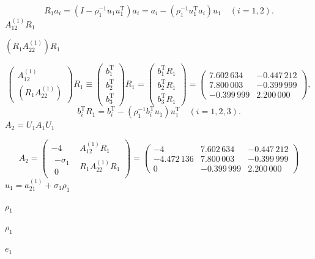 \documentclass[UTF8,fontset=fandol]{ctexart}
\begin{document}
\[
R_1a_i=(I-\rho_1^{-1}u_1u_1^{\mathrm T})a_i
=a_i-(\rho_1^{-1}u_1^{\mathrm T}a_i)u_1\quad(i=1,2).
\]
$A_{12}^{(1)}R_1$\par
$(R_1A_{22}^{(1)})R_1$\par
\[
\begin{pmatrix}A_{12}^{(1)}\\(R_1A_{22}^{(1)})\end{pmatrix}R_1
\equiv\begin{pmatrix}b_1^{\mathrm T}\\b_2^{\mathrm T}\\b_3^{\mathrm T}\end{pmatrix}R_1
=\begin{pmatrix}b_1^{\mathrm T}R_1\\b_2^{\mathrm T}R_1\\b_3^{\mathrm T}R_1\end{pmatrix}
=\begin{pmatrix}
7.602\,634&-0.447\,212\\
7.800\,003&-0.399\,999\\
-0.399\,999&2.200\,000
\end{pmatrix},
\]
\[
b_i^{\mathrm T}R_1=b_i^{\mathrm T}-(\rho_1^{-1}b_i^{\mathrm T}u_1)u_1^{\mathrm T}
\quad(i=1,2,3).
\]
$A_2=U_1A_1U_1$\par
\[
A_2=\begin{pmatrix}-4&A_{12}^{(1)}R_1\\
\begin{matrix}-\sigma_1\\0\end{matrix}&R_1A_{22}^{(1)}R_1
\end{pmatrix}
=\begin{pmatrix}
-4&7.602\,634&-0.447\,212\\
-4.472\,136&7.800\,003&-0.399\,999\\
0&-0.399\,999&2.200\,000
\end{pmatrix}
\]
$u_1=a_{21}^{(1)}+\sigma_1\rho_1$\par
$\rho_1$\par
$\rho_1$\par
$e_1$\par
\clearpage
\end{document}
